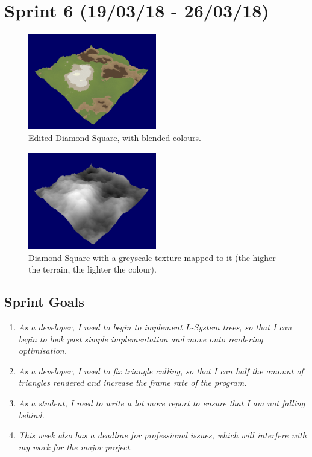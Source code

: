 \documentclass[a4paper,10pt]{report}
\begin{document}
\clearpage

\section{Sprint 6 (19/03/18 - 26/03/18)}



\begin{figure}[h!]
    \centering
  \includegraphics[width=0.5\textwidth]{Images/Sprint-Images/Sprint-7-After-Colour.png}
  \caption{Edited Diamond Square, with blended colours.}
  \label{fig:sprint7-c}
\end{figure}

\begin{figure}[h!]
    \centering
  \includegraphics[width=0.5\textwidth]{Images/Sprint-Images/Sprint-7-After-Greyscale.png}
  \caption{Diamond Square with a greyscale texture mapped to it (the higher the terrain, the lighter the colour).}  \label{fig:sprint7-g}
\end{figure}

\subsection{Sprint Goals}

\begin{enumerate}
    \item \textit{As a developer, I need to begin to implement L-System trees, so that I can begin to look past simple implementation and move onto rendering optimisation.  }
    \item \textit{As a developer, I need to fix triangle culling, so that I can half the amount of triangles rendered and increase the frame rate of the program.}
    \item \textit{As a student, I need to write a lot more report to ensure that I am not falling behind. }
    \item \textit{This week also has a deadline for professional issues, which will interfere with my work for the major project.}
    
\end{enumerate}
\end{document}

